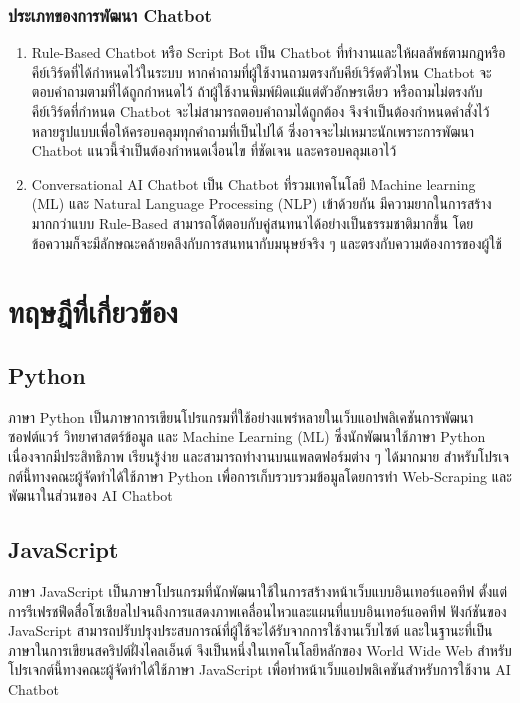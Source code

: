 \documentclass[12pt,oneside,openright,a4paper]{cpe-thai-project}
\begin{document}
\subsubsection{ประเภทของการพัฒนา Chatbot}
\begin{enumerate}
\item Rule-Based Chatbot หรือ Script Bot เป็น Chatbot ที่ทำงานและให้ผลลัพธ์ตามกฎหรือคีย์เวิร์ดที่ได้กำหนดไว้ในระบบ หากคําถามที่ผู้ใช้งานถามตรงกับคีย์เวิร์ดตัวไหน Chatbot จะตอบคําถามตามที่ได้ถูกกำหนดไว้ ถ้าผู้ใช้งานพิมพ์ผิดแม้แต่ตัวอักษรเดียว หรือถามไม่ตรงกับคีย์เวิร์ดที่กำหนด Chatbot จะไม่สามารถตอบคําถามได้ถูกต้อง จึงจำเป็นต้องกำหนดคำสั่งไว้หลายรูปแบบเพื่อให้ครอบคลุมทุกคําถามที่เป็นไปได้ ซึ่งอาจจะไม่เหมาะนักเพราะการพัฒนา Chatbot แนวนี้จำเป็นต้องกำหนดเงื่อนไข ที่ชัดเจน และครอบคลุมเอาไว้ 
\item Conversational AI Chatbot เป็น Chatbot ที่รวมเทคโนโลยี Machine learning (ML) และ Natural Language Processing (NLP) เข้าด้วยกัน มีความยากในการสร้างมากกว่าแบบ Rule-Based สามารถโต้ตอบกับคู่สนทนาได้อย่างเป็นธรรมชาติมากขึ้น โดยข้อความก็จะมีลักษณะคล้ายคลึงกับการสนทนากับมนุษย์จริง ๆ และตรงกับความต้องการของผู้ใช้
\end{enumerate}

\section{ทฤษฎีที่เกี่ยวข้อง}
\subsection{Python}
ภาษา Python \cite{python} เป็นภาษาการเขียนโปรแกรมที่ใช้อย่างแพร่หลายในเว็บแอปพลิเคชันการพัฒนาซอฟต์แวร์ วิทยาศาสตร์ข้อมูล และ Machine Learning (ML) ซึ่งนักพัฒนาใช้ภาษา Python เนื่องจากมีประสิทธิภาพ เรียนรู้ง่าย และสามารถทำงานบนแพลตฟอร์มต่าง ๆ ได้มากมาย สำหรับโปรเจกต์นี้ทางคณะผู้จัดทำได้ใช้ภาษา Python เพื่อการเก็บรวบรวมข้อมูลโดยการทำ Web-Scraping และพัฒนาในส่วนของ AI Chatbot

\subsection{JavaScript}
ภาษา JavaScript \cite{javascript, nodejs} เป็นภาษาโปรแกรมที่นักพัฒนาใช้ในการสร้างหน้าเว็บแบบอินเทอร์แอคทีฟ ตั้งแต่การรีเฟรชฟีดสื่อโซเชียลไปจนถึงการแสดงภาพเคลื่อนไหวและแผนที่แบบอินเทอร์แอคทีฟ ฟังก์ชันของ JavaScript สามารถปรับปรุงประสบการณ์ที่ผู้ใช้จะได้รับจากการใช้งานเว็บไซต์ และในฐานะที่เป็นภาษาในการเขียนสคริปต์ฝั่งไคลเอ็นต์ จึงเป็นหนึ่งในเทคโนโลยีหลักของ World Wide Web สำหรับโปรเจกต์นี้ทางคณะผู้จัดทำได้ใช้ภาษา JavaScript เพื่อทำหน้าเว็บแอปพลิเคชันสำหรับการใช้งาน AI Chatbot
\end{document}
